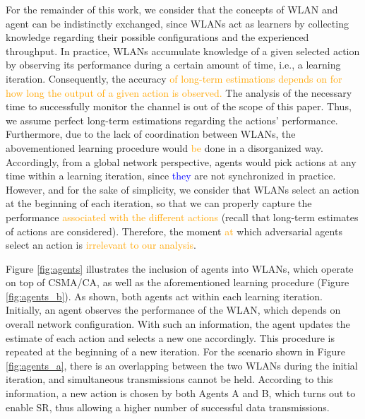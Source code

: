 \documentclass[preprint,12pt]{elsarticle}
\begin{document}
For the remainder of this work, we consider that the concepts of WLAN and agent can be indistinctly exchanged, since WLANs act as learners by collecting knowledge regarding their possible configurations and the experienced throughput. In practice, WLANs accumulate knowledge of a given selected action by observing its performance during a certain amount of time, i.e., a learning iteration. Consequently, the accuracy \textcolor{orange}{of long-term estimations depends on for how long the output of a given action is observed.} The analysis of the necessary time to successfully monitor the channel is out of the scope of this paper. Thus, we assume perfect long-term estimations regarding the actions' performance. 
Furthermore, due to the lack of coordination between WLANs, the abovementioned learning procedure would \textcolor{orange}{be} done in a disorganized way. Accordingly, from a global network perspective, agents would pick actions at any time within a learning iteration, since \textcolor{blue}{they} are not synchronized in practice. However, and for the sake of simplicity, we consider that WLANs select an action at the beginning of each iteration, so that we can properly capture the performance \textcolor{orange}{associated with the different actions} (recall that long-term estimates of actions are considered). Therefore, the moment \textcolor{orange}{at} which adversarial agents select an action is \textcolor{orange}{irrelevant to our analysis}.

Figure \ref{fig:agents} illustrates the inclusion of agents into WLANs, which operate on top of CSMA/CA, as well as the aforementioned learning procedure (Figure \ref{fig:agents_b}). As shown, both agents act within each learning iteration. Initially, an agent observes the performance of the WLAN, which depends on overall network configuration. With such an information, the agent updates the estimate of each action and selects a new one accordingly. This procedure is repeated at the beginning of a new iteration. For the scenario shown in Figure \ref{fig:agents_a}, there is an overlapping between the two WLANs during the initial iteration, and simultaneous transmissions cannot be held. According to this information, a new action is chosen by both Agents A and B, which turns out to enable SR, thus allowing a higher number of successful data transmissions.
\end{document}
